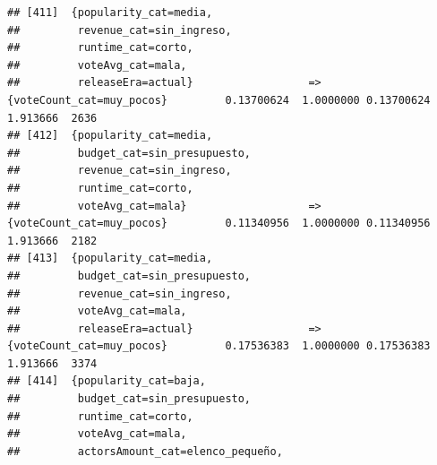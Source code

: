 \documentclass[
]{article}
\begin{document}
\begin{verbatim}
## [411]  {popularity_cat=media,                                                                                                   
##         revenue_cat=sin_ingreso,                                                                                                
##         runtime_cat=corto,                                                                                                      
##         voteAvg_cat=mala,                                                                                                       
##         releaseEra=actual}                  => {voteCount_cat=muy_pocos}         0.13700624  1.0000000 0.13700624 1.913666  2636
## [412]  {popularity_cat=media,                                                                                                   
##         budget_cat=sin_presupuesto,                                                                                             
##         revenue_cat=sin_ingreso,                                                                                                
##         runtime_cat=corto,                                                                                                      
##         voteAvg_cat=mala}                   => {voteCount_cat=muy_pocos}         0.11340956  1.0000000 0.11340956 1.913666  2182
## [413]  {popularity_cat=media,                                                                                                   
##         budget_cat=sin_presupuesto,                                                                                             
##         revenue_cat=sin_ingreso,                                                                                                
##         voteAvg_cat=mala,                                                                                                       
##         releaseEra=actual}                  => {voteCount_cat=muy_pocos}         0.17536383  1.0000000 0.17536383 1.913666  3374
## [414]  {popularity_cat=baja,                                                                                                    
##         budget_cat=sin_presupuesto,                                                                                             
##         runtime_cat=corto,                                                                                                      
##         voteAvg_cat=mala,                                                                                                       
##         actorsAmount_cat=elenco_pequeño,                                                                                        

\end{verbatim}
\end{document}
